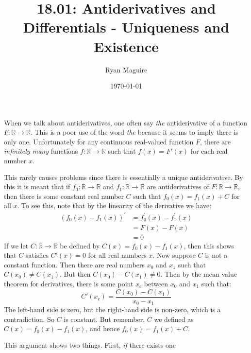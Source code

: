 \documentclass{article}
\title{18.01: Antiderivatives and Differentials - Uniqueness and Existence}
\author{Ryan Maguire}
\date{\today}
\begin{document}
    \maketitle
\fi
    When we talk about antiderivatives, one often say
    \textit{the} antiderivative of a function
    $F:\mathbb{R}\rightarrow\mathbb{R}$. This is a poor
    use of the word \textit{the} because it seems to imply there is only one.
    Unfortunately for any continuous
    real-valued function $F$,
    there are \textit{infinitely many} functions
    $f:\mathbb{R}\rightarrow\mathbb{R}$ such that $f(x)=F'(x)$
    for each real number $x$.
    \par\hfill\par
    This rarely causes problems since there is essentially a unique
    antiderivative. By this it is meant that if
    $f_{0}:\mathbb{R}\rightarrow\mathbb{R}$ and
    $f_{1}:\mathbb{R}\rightarrow\mathbb{R}$ are
    antiderivatives of $F:\mathbb{R}\rightarrow\mathbb{R}$,
    then there is some constant real number $C$
    such that $f_{0}(x)=f_{1}(x)+C$ for all $x$. To see this, note that by
    the linearity of the derivative we have:
    \begin{equation}
        \begin{aligned}
            \left(f_{0}(x)-f_{1}(x)\right)^{\prime}
                &=f_{0}^{\prime}(x)-f_{1}^{\prime}(x)\\
                &=F(x)-F(x)\\
                &=0
        \end{aligned}
    \end{equation}
    If we let $C:\mathbb{R}\rightarrow\mathbb{R}$ be defined by
    $C(x)=f_{0}(x)-f_{1}(x)$, then this shows that $C$ satisfies
    $C'(x)=0$ for all real numbers $x$. Now suppose $C$ is not a constant
    function. Then there are real numbers $x_{0}$ and $x_{1}$ such that
    $C(x_{0})\ne{C}(x_{1})$. But then $C(x_{0})-C(x_{1})\ne{0}$. Then by
    the mean value theorem for derivatives, there is some point
    $x_{c}$ between $x_{0}$ and $x_{1}$ such that:
    \begin{equation}
        C'(x_{c})=\frac{C(x_{0})-C(x_{1})}{x_{0}-x_{1}}
    \end{equation}
    The left-hand side is zero, but the right-hand side is non-zero, which is
    a contradiction. So $C$ is constant. But remember, $C$ we defined as
    $C(x)=f_{0}(x)-f_{1}(x)$, and hence $f_{0}(x)=f_{1}(x)+C$.
    \par\hfill\par
    This argument shows two things. First, \textit{if} there exists one
\end{document}
